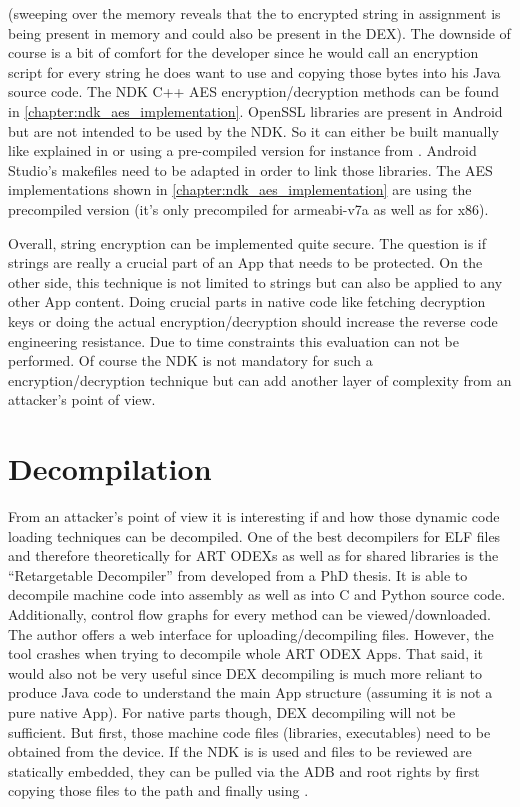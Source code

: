 (sweeping over the memory reveals that the to encrypted string in assignment
 is being present
in memory and could also be present in the DEX).
The downside of course is a bit of comfort for the developer since he would
call an encryption script for every string he does want to use and copying
those bytes into his Java source code.
The NDK C++ AES encryption/decryption methods can be found in \autoref{chapter:ndk_aes_implementation}. OpenSSL libraries are present in Android but are
not intended to be used by the NDK. So it can either be built manually
like explained in \parencite{openssl_building} or using a pre-compiled version
for instance from \parencite{openssl_precompiled}. Android Studio's makefiles
need to be adapted in order to link those libraries.
The AES implementations shown in \autoref{chapter:ndk_aes_implementation} are
using the precompiled version (it's only precompiled for armeabi-v7a as
well as for x86).

Overall, string encryption can be implemented quite secure. The question is
if strings are really a crucial part of an App that needs to be protected.
On the other side, this technique is not limited to strings but can also
be applied to any other App content. Doing crucial parts in native code
like fetching decryption keys or doing the actual encryption/decryption
should increase the reverse code engineering resistance. Due to time
constraints this evaluation can not be performed. Of course the NDK is not
mandatory for such a encryption/decryption technique but can add another
layer of complexity from an attacker's point of view.

\section{Decompilation}\label{section:decompilation}
From an attacker's point of view it is interesting if and how
those dynamic code loading techniques can be decompiled.
One of the best decompilers for ELF files and therefore
theoretically for ART ODEXs as well as for shared libraries is the
``Retargetable Decompiler'' from \parencite{retdec} developed from a PhD thesis.
It is able to decompile machine code into assembly as
well as into C and Python source code.
Additionally, control flow graphs for every method can be viewed/downloaded.
The author offers a web interface for uploading/decompiling
files. However, the tool crashes when trying to
decompile whole ART ODEX Apps. That said, it would
also not be very useful since DEX decompiling
is much more reliant to produce Java code to
understand the main App structure (assuming it is not a pure native App).
For native parts though, DEX decompiling will not be sufficient.
But first, those machine code files (libraries, executables) need to
be obtained from the device. If the NDK is is used and files to be
reviewed are statically embedded, they can be pulled via the ADB
and root rights by first copying those files to the 
path and finally using .


